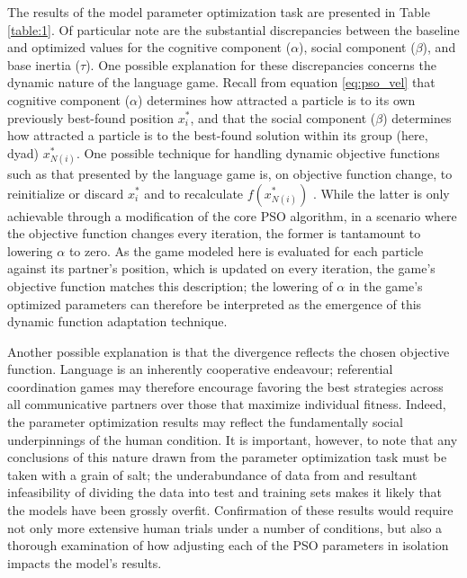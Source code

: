 \documentclass[a4paper,11pt]{article}
\begin{document}
The results of the model parameter optimization task are presented in Table \ref{table:1}. Of particular note are the substantial discrepancies between the baseline and optimized values for the cognitive component ($\alpha$), social component ($\beta$), and base inertia ($\tau$). One possible explanation for these discrepancies concerns the dynamic nature of the language game. Recall from equation \ref{eq:pso_vel} that cognitive component ($\alpha$) determines how attracted a particle is to its own previously best-found position $x_i^*$, and that the social component ($\beta$) determines how attracted a particle is to the best-found solution within its group (here, dyad) $x_{N(i)}^*$. One possible technique for handling dynamic objective functions such as that presented by the \citeauthor{rohde2012} language game is, on objective function change, to reinitialize or discard $x_i^*$ and to recalculate $f(x_{N(i)}^*)$ \cite{engelbrecht2005}. While the latter is only achievable through a modification of the core PSO algorithm, in a scenario where the objective function changes every iteration, the former is tantamount to lowering $\alpha$ to zero. As the game modeled here is evaluated for each particle against its partner's position, which is updated on every iteration, the game's objective function matches this description; the lowering of $\alpha$ in the game's optimized parameters can therefore be interpreted as the emergence of this dynamic function adaptation technique.

Another possible explanation is that the divergence reflects the chosen objective function. Language is an inherently cooperative endeavour; referential coordination games may therefore encourage favoring the best strategies across all communicative partners over those that maximize individual fitness. Indeed, the parameter optimization results may reflect the fundamentally social underpinnings of the human condition. It is important, however, to note that any conclusions of this nature drawn from the parameter optimization task must be taken with a grain of salt; the underabundance of data from \citeauthor{rohde2012} and resultant infeasibility of dividing the data into test and training sets makes it likely that the models have been grossly overfit. Confirmation of these results would require not only more extensive human trials under a number of conditions, but also a thorough examination of how adjusting each of the PSO parameters in isolation impacts the model's results.
\end{document}
